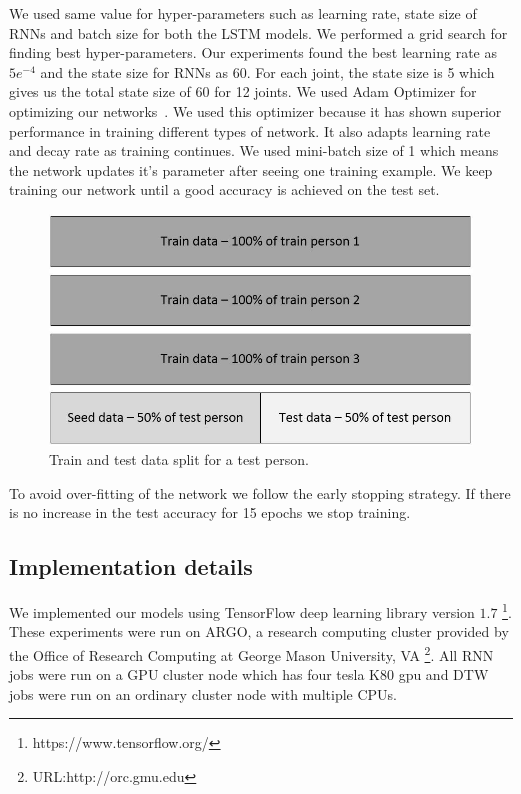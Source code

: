 \documentclass[10pt,twocolumn,letterpaper]{article}
\begin{document}
We used same value for hyper-parameters such as learning rate, state size of RNNs and batch size  for both the LSTM models. We performed 
a grid search for finding best hyper-parameters. Our experiments found the best learning rate as $5e^{-4}$ and the state size for RNNs as 60. For each joint, the state size is 5 which gives us the total 
state size of 60 for 12 joints. We used Adam Optimizer for optimizing our networks~\cite{DBLP:journals/corr/KingmaB14}. We used this 
optimizer because it has shown superior performance in training different types of network. It also adapts learning rate and 
decay rate as training continues. We used mini-batch size of 1 which means the network updates it's parameter after seeing one training example. We keep training our network until a good accuracy is achieved on the test set.
\begin{figure}[h]
	\begin{center}
		\includegraphics[width=\linewidth, height=.2\textheight]{train_test_dat}
	\end{center}
	\caption{Train and test data split for a test person.}
	\label{fig:train_test_dat}
\end{figure}
To avoid over-fitting of the network we follow the 
early stopping strategy. If there is no increase in the test accuracy for 15 epochs  we  stop training. 

\subsection{Implementation details}

We implemented our models using TensorFlow deep learning library 
version $1.7$ \footnote{https://www.tensorflow.org/}. These experiments were run on ARGO, a research computing 
cluster provided by the Office of Research Computing at 
George Mason University, VA \footnote{URL:http://orc.gmu.edu}.
All RNN jobs were run on a GPU cluster node which has four tesla K80 gpu and DTW jobs were run on an ordinary cluster node with multiple CPUs.
\end{document}
